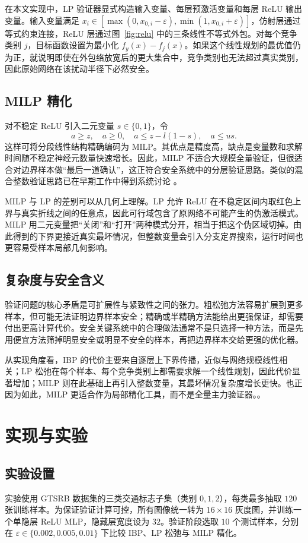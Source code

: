 \documentclass[11pt,a4paper]{ctexart}
\begin{document}
在本文实现中，LP 验证器显式构造输入变量、每层预激活变量和每层 ReLU 输出变量。输入变量满足 $x_i\in[\max(0,x_{0,i}-\varepsilon),\min(1,x_{0,i}+\varepsilon)]$，仿射层通过等式约束连接，ReLU 层通过图~\ref{fig:relu} 中的三条线性不等式外包。对每个竞争类别 $j$，目标函数设置为最小化 $f_y(x)-f_j(x)$。如果这个线性规划的最优值仍为正，就说明即使在外包络放宽后的更大集合中，竞争类别也无法超过真实类别，因此原始网络在该扰动半径下必然安全。

\subsection{MILP 精化}
对不稳定 ReLU 引入二元变量 $s\in\{0,1\}$，令
\[
a\ge z,\quad a\ge 0,\quad a\le z-l(1-s),\quad a\le us.
\]
这样可将分段线性结构精确编码为 MILP。其优点是精度高，缺点是变量数和求解时间随不稳定神经元数量快速增长。因此，MILP 不适合大规模全量验证，但很适合对边界样本做“最后一道确认”，这正符合安全系统中的分层验证思路。类似的混合整数验证思路已在早期工作中得到系统讨论 \cite{tjeng2017mip,singh2019boosting}。

MILP 与 LP 的差别可以从几何上理解。LP 允许 ReLU 在不稳定区间内取红色上界与真实折线之间的任意点，因此可行域包含了原网络不可能产生的伪激活模式。MILP 用二元变量把“关闭”和“打开”两种模式分开，相当于把这个伪区域切掉。由此得到的下界更接近真实最坏情况，但整数变量会引入分支定界搜索，运行时间也更容易受样本局部几何影响。

\subsection{复杂度与安全含义}
验证问题的核心矛盾是可扩展性与紧致性之间的张力。粗松弛方法容易扩展到更多样本，但可能无法证明边界样本安全；精确或半精确方法能给出更强保证，却需要付出更高计算代价。安全关键系统中的合理做法通常不是只选择一种方法，而是先用便宜方法筛掉明显安全或明显不安全的样本，再把边界样本交给更强的优化器。

从实现角度看，IBP 的代价主要来自逐层上下界传播，近似与网络规模线性相关；LP 松弛在每个样本、每个竞争类别上都需要求解一个线性规划，因此代价显著增加；MILP 则在此基础上再引入整数变量，其最坏情况复杂度增长更快。也正因为如此，MILP 更适合作为局部精化工具，而不是全量主力验证器。。

\section{实现与实验}
\subsection{实验设置}
实验使用 GTSRB 数据集的三类交通标志子集（类别 $0,1,2$），每类最多抽取 $120$ 张训练样本。为保证验证计算可控，所有图像统一转为 $16\times16$ 灰度图，并训练一个单隐层 ReLU MLP，隐藏层宽度设为 $32$。验证阶段选取 $10$ 个测试样本，分别在 $\varepsilon\in\{0.002,0.005,0.01\}$ 下比较 IBP、LP 松弛与 MILP 精化。
\end{document}

